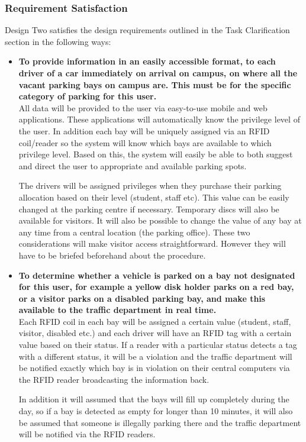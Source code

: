 \subsubsection{Requirement Satisfaction}
Design Two satisfies the design requirements outlined in the Task Clarification section in the following ways:

\begin{itemize}
\item \textbf{To provide information in an easily accessible format, to each driver of a car immediately on arrival on campus, on where all the vacant parking bays on campus are. This must be for the specific category of parking for this user.}\\
All data will be provided to the user via easy-to-use mobile and web applications. These applications
will automatically know the privilege level of the user. In addition each bay will be uniquely assigned
via an RFID coil/reader so the system will know which bays are available to which privilege level.
Based on this, the system will easily be able to both suggest and direct the user to appropriate and
available parking spots.

The drivers will be assigned privileges when they purchase their parking allocation based on their
level (student, staff etc). This value can be easily changed at the parking centre if necessary.
Temporary discs will also be available for visitors. It will also be possible to change the value of any
bay at any time from a central location (the parking office). These two considerations will make
visitor access straightforward. However they will have to be briefed beforehand about the
procedure.

\item \textbf{To determine whether a vehicle is parked on a bay not designated for this user, for example a yellow disk holder parks on a red bay, or a visitor parks on a disabled parking bay, and make this available to the traffic department in real time.}\\
Each RFID coil in each bay will be assigned a certain value (student, staff, visitor, disabled etc.) and
each driver will have an RFID tag with a certain value based on their status. If a reader with a
particular status detects a tag with a different status, it will be a violation and the traffic department
will be notified exactly which bay is in violation on their central computers via the RFID reader
broadcasting the information back.

In addition it will assumed that the bays will fill up completely during the day, so if a bay is detected
as empty for longer than 10 minutes, it will also be assumed that someone is illegally parking there
and the traffic department will be notified via the RFID readers.


\end{itemize}
